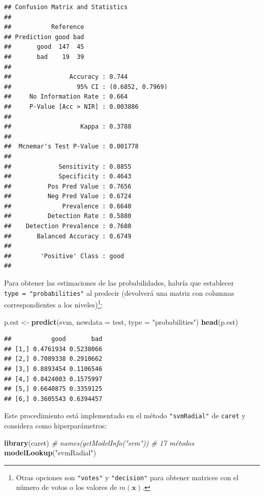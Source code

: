 \documentclass[
]{book}
\newenvironment{Shaded}{\begin{snugshade}}{\end{snugshade}}
\newcommand{\CommentTok}[1]{\textcolor[rgb]{0.56,0.35,0.01}{\textit{#1}}}
\newcommand{\DataTypeTok}[1]{\textcolor[rgb]{0.13,0.29,0.53}{#1}}
\newcommand{\KeywordTok}[1]{\textcolor[rgb]{0.13,0.29,0.53}{\textbf{#1}}}
\newcommand{\NormalTok}[1]{#1}
\newcommand{\StringTok}[1]{\textcolor[rgb]{0.31,0.60,0.02}{#1}}
\theoremstyle{break}
\theoremstyle{definition}
\theoremstyle{definition}
\theoremstyle{definition}
\theoremstyle{remark}
\begin{document}
\begin{verbatim}
## Confusion Matrix and Statistics
## 
##           Reference
## Prediction good bad
##       good  147  45
##       bad    19  39
##                                           
##                Accuracy : 0.744           
##                  95% CI : (0.6852, 0.7969)
##     No Information Rate : 0.664           
##     P-Value [Acc > NIR] : 0.003886        
##                                           
##                   Kappa : 0.3788          
##                                           
##  Mcnemar's Test P-Value : 0.001778        
##                                           
##             Sensitivity : 0.8855          
##             Specificity : 0.4643          
##          Pos Pred Value : 0.7656          
##          Neg Pred Value : 0.6724          
##              Prevalence : 0.6640          
##          Detection Rate : 0.5880          
##    Detection Prevalence : 0.7680          
##       Balanced Accuracy : 0.6749          
##                                           
##        'Positive' Class : good            
## 
\end{verbatim}

Para obtener las estimaciones de las probabilidades, habría que establecer
\texttt{type\ =\ "probabilities"} al predecir (devolverá una matriz con columnas
correspondientes a los niveles)\footnote{Otras opciones son \texttt{"votes"} y \texttt{"decision"} para obtener matrices con el número de votos o los valores de \(m(\mathbf{x})\).}:

\begin{Shaded}
\begin{Highlighting}[]
\NormalTok{p.est <-}\StringTok{ }\KeywordTok{predict}\NormalTok{(svm, }\DataTypeTok{newdata =}\NormalTok{ test, }\DataTypeTok{type =} \StringTok{"probabilities"}\NormalTok{)}
\KeywordTok{head}\NormalTok{(p.est)}
\end{Highlighting}
\end{Shaded}

\begin{verbatim}
##           good       bad
## [1,] 0.4761934 0.5238066
## [2,] 0.7089338 0.2910662
## [3,] 0.8893454 0.1106546
## [4,] 0.8424003 0.1575997
## [5,] 0.6640875 0.3359125
## [6,] 0.3605543 0.6394457
\end{verbatim}

Este procedimiento está implementado en el método \texttt{"svmRadial"} de \texttt{caret} y considera como hiperparámetros:

\begin{Shaded}
\begin{Highlighting}[]
\KeywordTok{library}\NormalTok{(caret)}
\CommentTok{# names(getModelInfo("svm")) # 17 métodos}
\KeywordTok{modelLookup}\NormalTok{(}\StringTok{"svmRadial"}\NormalTok{)}
\end{Highlighting}
\end{Shaded}
\end{document}
